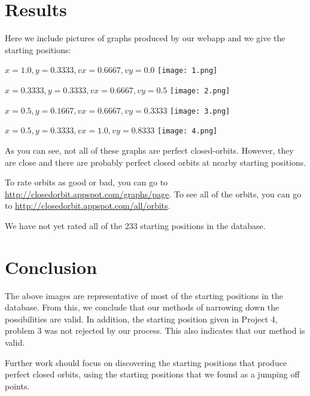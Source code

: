 \documentclass[11pt]{article}
\begin{document}
\newpage
\section{Results}

Here we include pictures of graphs produced by our webapp and we give the starting positions:

\begin{center}
$x = 1.0, y = 0.3333, vx = 0.6667, vy = 0.0 $
\texttt{[image: 1.png]}
\end{center}

\newpage
\begin{center}
$x = 0.3333, y = 0.3333, vx = 0.6667, vy = 0.5 $
\texttt{[image: 2.png]}
\end{center}

\newpage
\begin{center}
$x = 0.5, y = 0.1667, vx = 0.6667, vy = 0.3333 $
\texttt{[image: 3.png]}
\end{center}

\newpage
\begin{center}
$x = 0.5, y = 0.3333, vx = 1.0, vy = 0.8333 $
\texttt{[image: 4.png]}
\end{center}

As you can see, not all of these graphs are perfect closed-orbits. However, they are close and there are probably perfect closed orbits at nearby starting positions. 

To rate orbits as good or bad, you can go to \url{http://closedorbit.appspot.com/graphs/page}. To see all of the orbits, you can go to \url{http://closedorbit.appspot.com/all/orbits}.

We have not yet rated all of the 233 starting positions in the database.

\section{Conclusion}

The above images are representative of most of the starting positions in the database. From this, we conclude that our methods of narrowing down the possibilities are valid. In addition, the starting position given in Project 4, problem 3 was not rejected by our process. This also indicates that our method is valid.

Further work should focus on discovering the starting positions that produce perfect closed orbits, using the starting positions that we found as a jumping off points.
\end{document}
